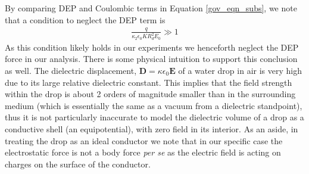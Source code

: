\documentclass[12pt,a4paper,oneside]{book}
\begin{document}
By comparing DEP and Coulombic terms in Equation \ref{gov_eqn_subs}, we note that a condition to neglect the DEP term is
\begin{eqnarray}
\frac{q}{ \kappa_2 \epsilon_0 K R_d^2 E_0} \gg 1 \nonumber
\end{eqnarray}
As this condition likely holds in our experiments we henceforth neglect the DEP force in our analysis. There is some physical intuition to support this conclusion as well. The dielectric displacement, $\mathbf{D} = \kappa \epsilon_0 \mathbf{E}$ of a water drop in air is very high due to its large relative dielectric constant. This implies that the field strength within the drop is about 2 orders of magnitude smaller than in the surrounding medium (which is essentially the same as a vacuum from a dielectric standpoint), thus it is not particularly inaccurate to model the dielectric volume of a drop as a conductive shell (an equipotential), with zero field in its interior. As an aside, in treating the drop as an ideal conductor we note that in our specific case the electrostatic force is not a body force \emph{per se} as the electric field is acting on charges on the surface of the conductor.
\end{document}

